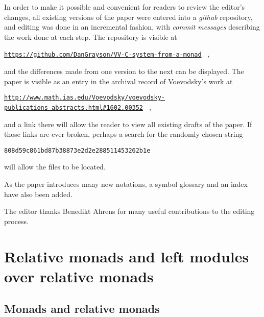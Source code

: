 \documentclass[onecolumn,12pt]{amsart}
\numberwithin{proposition}{subsection}
\newcommand{\wh}{\widehat}
\begin{document}
In order to make it possible and convenient for readers to review the editor's
changes, all existing versions of the paper were entered into a {\em github}
repository, and editing was done in an incremental fashion, with {\em commit
  messages} describing the work done at each step.  The repository is visible
at
\hfill\break\centerline{\tiny{\tt \href{https://github.com/DanGrayson/VV-C-system-from-a-monad}{https://github.com/DanGrayson/VV-C-system-from-a-monad}%
  } ,}
and the differences made from one version to the next can be displayed.
The paper is visible as an entry in the archival record of Voevodsky's work at
\hfill\break\centerline{\tiny{\tt \href{http://www.math.ias.edu/Voevodsky/voevodsky-publications\_abstracts.html\#1602.00352}{http://www.math.ias.edu/Voevodsky/voevodsky-publications\_abstracts.html\#1602.00352}%
  } ,}
and a link there will allow the reader to view all existing drafts of the paper.
If those links are ever broken, perhaps a search for the randomly chosen string
\hfill\break\centerline{\tiny{\tt 808d59c861bd87b38873e2d2e288511453262b1e}}
will allow the files to be located.

As the paper introduces many new notations, a symbol glossary and an index have
also been added.

The editor thanks Benedikt Ahrens for many useful contributions to the editing
process.


\section{Relative monads and left modules over relative monads}
\label{sec:rel-monads-and-modules}

\subsection{Monads and relative monads} 
\end{document}
